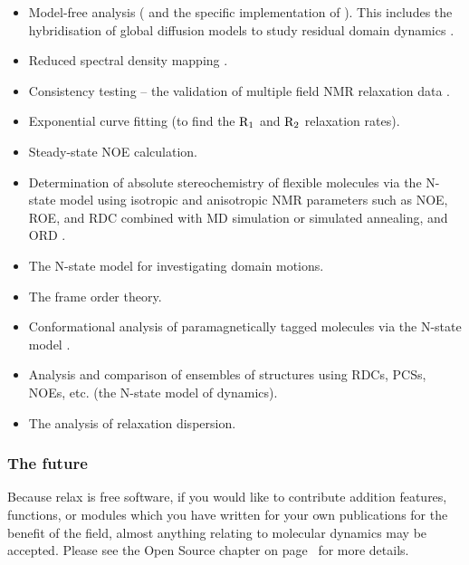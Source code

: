 \begin{itemize}
\item Model-free analysis (\citet{LipariSzabo82a, LipariSzabo82b, Clore90a} and the specific implementation of \citet{dAuvergneGooley03,dAuvergneGooley06,dAuvergneGooley07,dAuvergneGooley08a,dAuvergneGooley08b}).  This includes the hybridisation of global diffusion models to study residual domain dynamics \citep{Horne07}.
\item Reduced spectral density mapping \citep{Farrow95, Lefevre96}.
\item Consistency testing -- the validation of multiple field NMR relaxation data \citep{MorinGagne09a,Fushman99}.
\item Exponential curve fitting (to find the $\mathrm{R}_1$ and $\mathrm{R}_2$ relaxation rates).
\item Steady-state NOE calculation.
\item Determination of absolute stereochemistry of flexible molecules via the N-state model using isotropic and anisotropic NMR parameters such as NOE, ROE, and RDC combined with MD simulation or simulated annealing, and ORD \citep{Sun11}.
\item The N-state model for investigating domain motions.
\item The frame order theory.
\item Conformational analysis of paramagnetically tagged molecules via the N-state model \citep{Erdelyi11}.
\item Analysis and comparison of ensembles of structures using RDCs, PCSs, NOEs, etc. (the N-state model of dynamics).
\item The analysis of relaxation dispersion.
\end{itemize}


\subsubsection{The future}

Because relax is free software, if you would like to contribute addition features, functions, or modules which you have written for your own publications for the benefit of the field, almost anything relating to molecular dynamics may be accepted.  Please see the Open Source chapter on page~\pageref{ch: open source} for more details.




